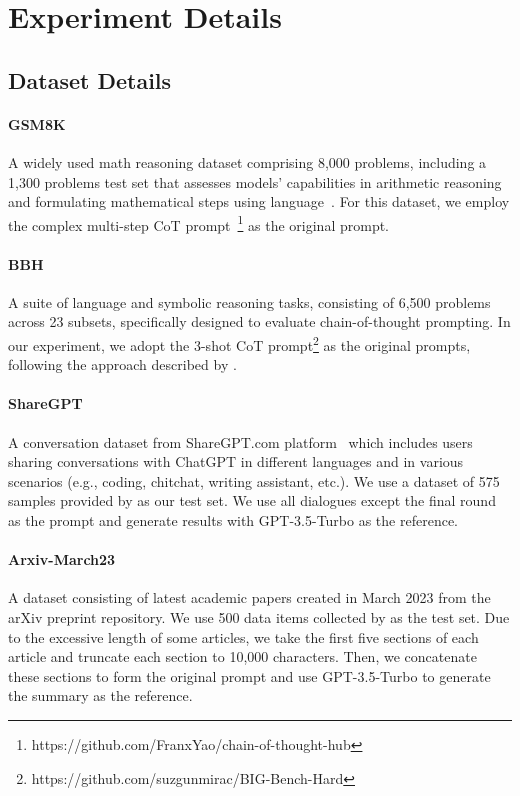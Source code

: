 \section{Experiment Details}
\subsection{Dataset Details}
\label{sec:dataset_detail}

\paragraph{GSM8K}
A widely used math reasoning dataset comprising 8,000 problems, including a 1,300 problems test set that assesses models' capabilities in arithmetic reasoning and formulating mathematical steps using language~\cite{cobbe2021training}. For this dataset, we employ the complex multi-step CoT prompt~\cite{fu2023complexitybased}\footnote{https://github.com/FranxYao/chain-of-thought-hub} as the original prompt.

\paragraph{BBH}
A suite of language and symbolic reasoning tasks, consisting of 6,500 problems across 23 subsets, specifically designed to evaluate chain-of-thought prompting. In our experiment, we adopt the 3-shot CoT prompt\footnote{https://github.com/suzgunmirac/BIG-Bench-Hard} as the original prompts, following the approach described by \citet{suzgun2022challenging}.

\paragraph{ShareGPT}
A conversation dataset from ShareGPT.com platform~\cite{sharegpt} which includes users sharing conversations with ChatGPT in different languages and in various scenarios (e.g., coding, chitchat, writing assistant, etc.). We use a dataset of 575 samples provided by \citet{li2023unlocking} as our test set. We use all dialogues except the final round as the prompt and generate results with GPT-3.5-Turbo as the reference.

\paragraph{Arxiv-March23}
A dataset consisting of latest academic papers created in March 2023 from the arXiv preprint repository. We use 500 data items collected by \citet{li2023unlocking} as the test set. Due to the excessive length of some articles, we take the first five sections of each article and truncate each section to 10,000 characters. Then, we concatenate these sections to form the original prompt and use GPT-3.5-Turbo to generate the summary as the reference.

